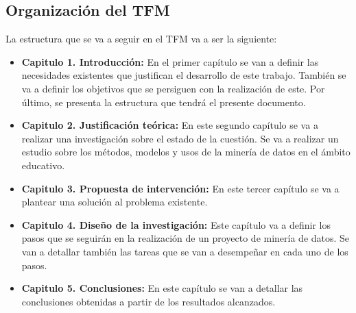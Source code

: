 



\subsection{Organización del TFM}
La estructura que se va a seguir en el TFM va a ser la siguiente:
\begin{itemize}
	\item \textbf{Capitulo 1. Introducción:} En el primer capítulo se van a definir las necesidades existentes que justifican el desarrollo de este trabajo. También se va a definir los objetivos que se persiguen con la realización de este. Por último, se presenta la estructura que tendrá el presente documento.
	\item \textbf{Capitulo 2. Justificación teórica:} En este segundo capítulo se va a realizar una investigación sobre el estado de la cuestión. Se va a realizar un estudio sobre los métodos, modelos y usos de la minería de datos en el ámbito educativo. 
	\item \textbf{Capitulo 3. Propuesta de intervención:} En este tercer capítulo se va a plantear una solución al problema existente. 
	\item \textbf{Capitulo 4. Diseño de la investigación:} Este capítulo va a definir los pasos que se seguirán en la realización de un proyecto de minería de datos. Se van a detallar también las tareas que se van a desempeñar en cada uno de los pasos.
	\item \textbf{Capitulo 5. Conclusiones:} En este capítulo se van a detallar las conclusiones obtenidas a partir de los resultados alcanzados.
\end{itemize}




